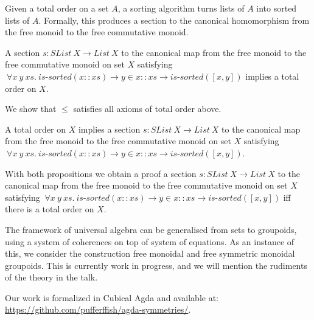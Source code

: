 \documentclass{article}
\begin{document}
Given a total order on a set $A$, a sorting algorithm turns lists of $A$ into sorted lists of $A$.
%
Formally, this produces a section to the canonical homomorphism from the free monoid to the free commutative monoid.

\begin{mythm}
    A section $s : SList \: X \rightarrow List \: X$ to the canonical map from the free monoid to the free commutative monoid on set $X$
    satisfying
    $\: \forall x \: y \: xs. \: \textit{is-sorted}(x :: xs) \rightarrow y \in x :: xs \rightarrow \textit{is-sorted}([x, y])$
    implies a total order on $X$.
\end{mythm}
    We show that $\leq$ satisfies all axioms of total order above.

\begin{mythm}
    A total order on $X$ implies
    a section $s : SList \: X \rightarrow List \: X$ to the canonical map from the free monoid to the free commutative monoid on set $X$
    satisfying
    $\: \forall x \: y \: xs. \: \textit{is-sorted}(x :: xs) \rightarrow y \in x :: xs \rightarrow \textit{is-sorted}([x, y])$.
\end{mythm}
    With both propositions we obtain a proof
    a section $s : SList \: X \rightarrow List \: X$ to the canonical map from the free monoid to the free commutative monoid on set $X$
    satisfying
    $\: \forall x \: y \: xs. \: \textit{is-sorted}(x :: xs) \rightarrow y \in x :: xs \rightarrow \textit{is-sorted}([x, y])$
    iff there is a total order on $X$.


The framework of universal algebra can be generalised from sets to groupoids, using a system of coherences on top of
system of equations. As an instance of this, we consider the construction free monoidal and free symmetric monoidal
groupoids. This is currently work in progress, and we will mention the rudiments of the theory in the talk.

Our work is formalized in Cubical Agda and available at: \url{https://github.com/pufferffish/agda-symmetries/}.

\printbibliography
\end{document}
